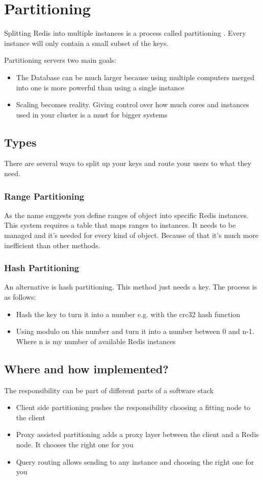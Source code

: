 \chapter{Partitioning}

Splitting Redis into multiple instances is a process called partitioning \cite{redis_partitioning}. Every instance will only contain a small subset of the keys.

Partitioning servers two main goals:
\begin{itemize}
	\item The Database can be much larger because using multiple computers merged into one is more powerful than using a single instance
	\item Scaling becomes reality. Giving control over how much cores and instances used in your cluster is a must for bigger systems
\end{itemize}

\section{Types}
There are several ways to split up your keys and route your users to what they need.

\subsection{Range Partitioning}
As the name suggests you define ranges of object into specific Redis instances. This system requires a table that maps ranges to instances. It needs to be managed and it's needed for every kind of object. Because of that it's much more inefficient than other methods.
\subsection{Hash Partitioning}
An alternative is hash partitioning. This method just needs a key. The process is as follows:
\begin{itemize}
	\item Hash the key to turn it into a number e.g. with the crc32 hash function
	\item Using modulo on this number and turn it into a number between 0 and n-1. Where n is my number of available Redis instances
\end{itemize}

\section{Where and how implemented?}
The responsibility can be part of different parts of a software stack
\begin{itemize}
	\item Client side partitioning pushes the responsibility choosing a fitting node to the client
	\item Proxy assisted partitioning adds a proxy layer between the client and a Redis node. It chooses the right one for you
	\item Query routing allows sending to any instance and choosing the right one for you
\end{itemize}

